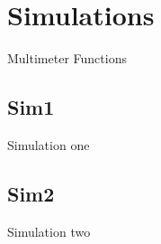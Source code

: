 \section{Simulations}

Multimeter Functions

\subsection{Sim1}

Simulation one

\subsection{Sim2}

Simulation two

